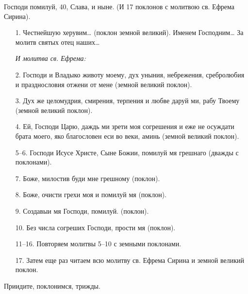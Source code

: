 Господи помилуй, 40, Слава, и ныне. (И 17 поклонов с молитвою св. Ефрема Сирина).

\begin{enumerate}

\item[1.] Честнейшую херувим… (поклон земной великий). Именем Господним… За молитв святых отец наших…


\itshape И молитва св. Ефрема:\normalfont{}


\item[2.] Господи и Владыко животу моему, дух уныния, небрежения, сребролюбия и празднословия отжени от мене (земной великий поклон).


\item[3.] Дух же целомудрия, смирения, терпения и любве даруй ми, рабу Твоему (земной великий поклон).


\item[4.] Ей, Господи Царю, даждь ми зрети моя согрешения и еже не осуждати брата моего, яко благословен еси во веки, аминь (земной великий поклон).


\item[5--6.] Господи Исусе Христе, Сыне Божии, помилуй мя грешнаго (дважды с поклонами).

\item[7.] Боже, милостив буди мне грешному (поклон).


\item[8.] Боже, очисти грехи моя и помилуй мя (поклон).


\item[9.] Создавыи мя Господи, помилуй. (поклон).


\item[10.] Без числа согреших Господи, прости мя (поклон).


\item[11--16.] Повторяем молитвы 5--10 с земными поклонами.


\item[17.] Затем еще раз читаем всю молитву св. Ефрема Сирина и земной великий поклон.

\end{enumerate}

Приидите, поклонимся, трижды.




